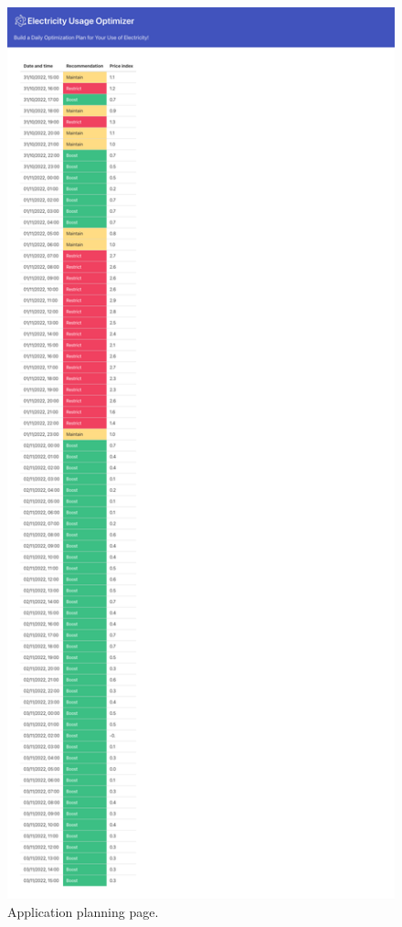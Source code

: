 \begin{figure}[H]
    \centering
    \includegraphics[height=0.9\textheight]{report/images/application-planning.png}
    \caption{Application planning page.}
    \label{fig:app-planning-page}
\end{figure}